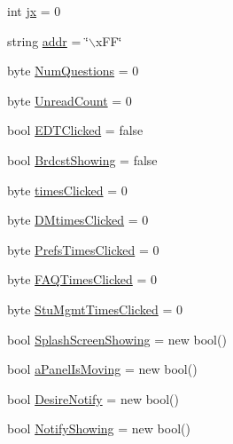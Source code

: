 \begin{DoxyCompactItemize}
int \hyperlink{class_sr_p___classroom_inq_1_1frm_classrrom_inq_a6206484c9b4d5d7558f8904cad77cded}{jx} = 0
\item 
string \hyperlink{class_sr_p___classroom_inq_1_1frm_classrrom_inq_ab99245163109493292f36ab5011c4f76}{addr} = \char`\"{}$\backslash$x\-F\-F\char`\"{}
\item 
byte \hyperlink{class_sr_p___classroom_inq_1_1frm_classrrom_inq_a7e4d497088afdd32623b3b54749210a0}{\-Num\-Questions} = 0
\item 
byte \hyperlink{class_sr_p___classroom_inq_1_1frm_classrrom_inq_a9978aff45fb1057f102e224f8485f096}{\-Unread\-Count} = 0
\item 
bool \hyperlink{class_sr_p___classroom_inq_1_1frm_classrrom_inq_a2f126b875f216c20427f6818976a9465}{\-E\-D\-T\-Clicked} = false
\item 
bool \hyperlink{class_sr_p___classroom_inq_1_1frm_classrrom_inq_a03327a44c502ac413d982a79dce5483c}{\-Brdcst\-Showing} = false
\item 
byte \hyperlink{class_sr_p___classroom_inq_1_1frm_classrrom_inq_a8b01f872cc35c75e41502f5114a65b74}{times\-Clicked} = 0
\item 
byte \hyperlink{class_sr_p___classroom_inq_1_1frm_classrrom_inq_a595a5c6942aa919d47de2b3e20f5f5bc}{\-D\-Mtimes\-Clicked} = 0
\item 
byte \hyperlink{class_sr_p___classroom_inq_1_1frm_classrrom_inq_a649306fdbca853561ee4a6cac829315a}{\-Prefs\-Times\-Clicked} = 0
\item 
byte \hyperlink{class_sr_p___classroom_inq_1_1frm_classrrom_inq_a81d1b27ebc720a6da339e1816eab4dfa}{\-F\-A\-Q\-Times\-Clicked} = 0
\item 
byte \hyperlink{class_sr_p___classroom_inq_1_1frm_classrrom_inq_a8746b34d859922daf9b2d5b00cef317e}{\-Stu\-Mgmt\-Times\-Clicked} = 0
\item 
bool \hyperlink{class_sr_p___classroom_inq_1_1frm_classrrom_inq_a7e52871d9da2c0a9364fd22a8743d7bd}{\-Splash\-Screen\-Showing} = new bool()
\item 
bool \hyperlink{class_sr_p___classroom_inq_1_1frm_classrrom_inq_ac17e540d0c6f7127a478c861290c883c}{a\-Panel\-Is\-Moving} = new bool()
\item 
bool \hyperlink{class_sr_p___classroom_inq_1_1frm_classrrom_inq_a39e6b524ac1f9239b638d8c3fe0fca7e}{\-Desire\-Notify} = new bool()
\item 
bool \hyperlink{class_sr_p___classroom_inq_1_1frm_classrrom_inq_a13f540b89ba154a7b133ae266eeb18aa}{\-Notify\-Showing} = new bool()
\item 

\end{DoxyCompactItemize}
